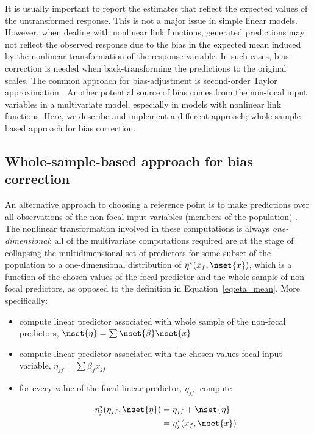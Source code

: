 It is usually important to report the estimates that reflect the expected values of the untransformed response. This is not a major issue in simple linear models. However, when dealing with nonlinear link functions,  generated predictions may not reflect the observed response due to the bias in the expected mean induced by the nonlinear transformation of the response variable. In such cases, bias correction is needed when back-transforming the predictions to the original scales. The common approach for bias-adjustment is second-order Taylor approximation \citep{lenth2018package, duursma2003bias}. Another potential source of bias comes from the non-focal input variables in a multivariate model, especially in models with nonlinear link functions. Here, we describe and implement a different approach; whole-sample-based approach for bias correction.


\subsection{Whole-sample-based approach for bias correction}

An alternative approach to choosing a reference point is to make predictions over all observations of the non-focal input variables (members of the population) \citep{hanmer2013behind}. The nonlinear transformation involved in these computations is always \emph{one-dimensional}; all of the multivariate computations required are at the stage of collapsing the multidimensional set of predictors for some subset of the population to a one-dimensional distribution of $\eta^\star(x_f, \nset{x})$, which is a function of the chosen values of the focal predictor and the whole sample of non-focal predictors, as opposed to the definition in Equation~\ref{eq:eta_mean}. More specifically:
\begin{itemize}
\item compute linear predictor associated with whole sample of the non-focal predictors, $\nset{\eta} = \sum \nset{\beta} \nset{x}$
\item compute linear predictor associated with the chosen values focal input variable, $\eta_{jf} = \sum{\beta_f x_{jf}}$
\item for every value of the focal linear predictor, $\eta_{jf}$, compute

\begin{align}\label{eq:pop_eta} 
\eta_j^\star(\eta_{jf}, \nset{\eta})  &= \eta_{jf} + \nset{\eta} \nonumber \\
&= \eta_j^\star(x_f, \nset{x})
\end{align}
\end{itemize}

